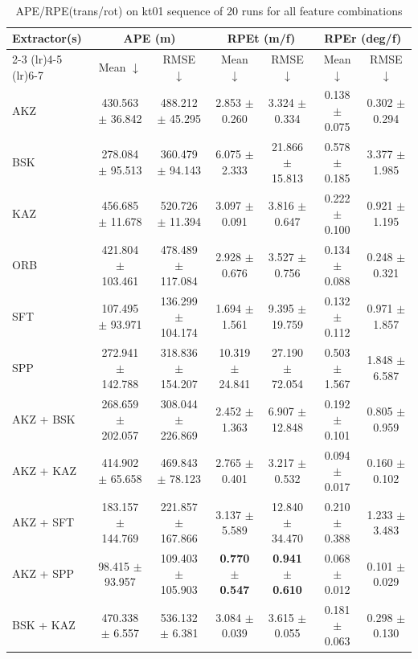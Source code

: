 \begin{table}[hbp]
\centering
\caption{APE/RPE(trans/rot) on kt01 sequence of 20 runs for all feature combinations}
\scriptsize
\label{tab:kt01_ape_rpe}\
\setlength{\tabcolsep}{3pt}
\begin{tabular}{lcccccc}
\toprule
\textbf{Extractor(s)}
& \multicolumn{2}{c}{\textbf{APE (m)}}
& \multicolumn{2}{c}{\textbf{RPEt (m/f)}}
& \multicolumn{2}{c}{\textbf{RPEr (deg/f)}} \\
\cmidrule(lr){2-3} \cmidrule(lr){4-5} \cmidrule(lr){6-7}
& Mean $\downarrow$ & RMSE $\downarrow$
& Mean $\downarrow$ & RMSE $\downarrow$
& Mean $\downarrow$ & RMSE $\downarrow$ \\
\midrule
AKZ & 430.563 $\pm$ 36.842 & 488.212 $\pm$ 45.295 & 2.853 $\pm$ 0.260 & 3.324 $\pm$ 0.334 & 0.138 $\pm$ 0.075 & 0.302 $\pm$ 0.294 \\
BSK & 278.084 $\pm$ 95.513 & 360.479 $\pm$ 94.143 & 6.075 $\pm$ 2.333 & 21.866 $\pm$ 15.813 & 0.578 $\pm$ 0.185 & 3.377 $\pm$ 1.985 \\
KAZ & 456.685 $\pm$ 11.678 & 520.726 $\pm$ 11.394 & 3.097 $\pm$ 0.091 & 3.816 $\pm$ 0.647 & 0.222 $\pm$ 0.100 & 0.921 $\pm$ 1.195 \\
ORB & 421.804 $\pm$ 103.461 & 478.489 $\pm$ 117.084 & 2.928 $\pm$ 0.676 & 3.527 $\pm$ 0.756 & 0.134 $\pm$ 0.088 & 0.248 $\pm$ 0.321 \\
SFT & 107.495 $\pm$ 93.971 & 136.299 $\pm$ 104.174 & 1.694 $\pm$ 1.561 & 9.395 $\pm$ 19.759 & 0.132 $\pm$ 0.112 & 0.971 $\pm$ 1.857 \\
SPP & 272.941 $\pm$ 142.788 & 318.836 $\pm$ 154.207 & 10.319 $\pm$ 24.841 & 27.190 $\pm$ 72.054 & 0.503 $\pm$ 1.567 & 1.848 $\pm$ 6.587 \\
AKZ + BSK & 268.659 $\pm$ 202.057 & 308.044 $\pm$ 226.869 & 2.452 $\pm$ 1.363 & 6.907 $\pm$ 12.848 & 0.192 $\pm$ 0.101 & 0.805 $\pm$ 0.959 \\
AKZ + KAZ & 414.902 $\pm$ 65.658 & 469.843 $\pm$ 78.123 & 2.765 $\pm$ 0.401 & 3.217 $\pm$ 0.532 & 0.094 $\pm$ 0.017 & 0.160 $\pm$ 0.102 \\
AKZ + SFT & 183.157 $\pm$ 144.769 & 221.857 $\pm$ 167.866 & 3.137 $\pm$ 5.589 & 12.840 $\pm$ 34.470 & 0.210 $\pm$ 0.388 & 1.233 $\pm$ 3.483 \\
AKZ + SPP & 98.415 $\pm$ 93.957 & 109.403 $\pm$ 105.903 & \textbf{0.770 $\pm$ 0.547} & \textbf{0.941 $\pm$ 0.610} & 0.068 $\pm$ 0.012 & 0.101 $\pm$ 0.029 \\
BSK + KAZ & 470.338 $\pm$ 6.557 & 536.132 $\pm$ 6.381 & 3.084 $\pm$ 0.039 & 3.615 $\pm$ 0.055 & 0.181 $\pm$ 0.063 & 0.298 $\pm$ 0.130 \\

\end{tabular}
\end{table}
